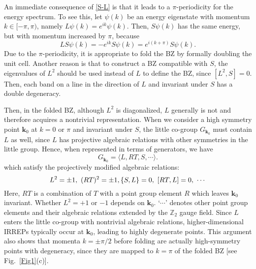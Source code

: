 \documentclass[aps,prl,twocolumn,noshowpacs,superscriptaddress]{revtex4-1}
\def \Z {\mathbb{Z}}
\def \k {\bm{k}}
\begin{document}
An immediate consequence of \eqref{S-L} is that it leads to a $\pi$-periodicity for the energy spectrum. To see this, let $\psi(k)$ be an energy eigenstate with momentum $k\in[-\pi,\pi)$, namely
$L\psi(k)=e^{ik}\psi(k)$. Then, $S\psi(k)$ has the same energy, but with momentum increased by $\pi$, because
\begin{equation}\label{eq2}
  LS\psi(k)=-e^{ik}S\psi(k)=e^{i(k+\pi)}S\psi(k).
\end{equation}
Due to the $\pi$-periodicity, it is appropriate to fold the BZ by formally doubling the unit cell. Another reason is that to construct a BZ compatible with $S$, the eigenvalues of $L^2$ should be used instead of $L$ to define the BZ, since $[L^2,S]=0$. Then, each band on a line in the direction of $L$ and invariant under $S$ has a double degeneracy.

Then, in the folded BZ, although $L^2$ is diagonalized, $L$ generally is not and therefore acquires a nontrivial representation. When we consider a high symmetry point $\k_0$ at $k=0$ or $\pi$ and invariant under $S$, the little co-group $G_{\k_0}$ must contain $L$ as well, since $L$ has projective algebraic relations with other symmetries in the little group. Hence, when represented in terms of generators, we have
\begin{equation}
	G_{\k_0}=\langle L, RT, S,  \cdots \rangle.
\end{equation}
which satisfy the projectively modified algebraic relations:
\begin{equation}
L^2=\pm 1,~ (RT)^2=\pm 1,\\ \{S,L\}=0,~[RT,L]=0,\ \cdots
\end{equation}
Here, $RT$ is a combination of $T$ with a point group element $R$ which leaves $\k_0$ invariant. Whether $L^2=+ 1$ or $-1$ depends on $\k_0$. `$\cdots$' denotes other point group elements and their algebraic relations extended by the $\Z_2$ gauge field. Since $L$ enters the little co-group with nontrivial algebraic relations, higher-dimensional IRREPs typically occur at $\k_0$, leading to highly degenerate points. This argument also shows that momenta $k=\pm \pi/2$ before folding are actually high-symmetry points with degeneracy, since they are mapped to $k=\pi$ of the folded BZ [see Fig.~\ref{Fig1}(c)].
\end{document}
